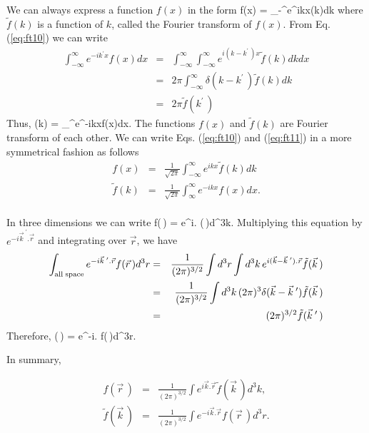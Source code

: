 We can always express a function $f(x)$ in the form
\be
f(x) = \int_{-\infty}^{\infty}e^{ikx}(k)dk
\label{eq:ft10}
\ee
where $\tilde{f}(k)$ is a function of $k$, called the Fourier transform of $f(x)$. From Eq. (\ref{eq:ft10}) we can write
\begin{eqnarray*}
\int_{-\infty}^{\infty}e^{-ik^{\prime}x}f(x)dx &=& \int_{-\infty}^{\infty}\int_{-\infty}^{\infty}e^{i(k-k^{\prime}\,)x}
\tilde{f}(k)dkdx \\
&=& 2\pi \int_{-\infty}^{\infty}\delta(k-k^{\prime}\,)\tilde{f}(k)dk \\
&=& 2\pi \tilde{f}(k^{\prime}\,)
\end{eqnarray*}
Thus, 
\be
{}(k) = \int_{\infty}^{\infty}e^{-ikx}f(x)dx.
\label{eq:ft11}
\ee
The functions $f(x)$ and $\tilde{f}(k)$ are Fourier transform of each other. We can write Eqs. (\ref{eq:ft10}) 
and (\ref{eq:ft11}) in a more symmetrical fashion as follows
\begin{eqnarray}
f(x)& = &\frac{1}{\sqrt{2\pi}} \int_{-\infty}^{\infty}e^{ikx}\tilde{f}(k)dk \\
\tilde{f}(k) &=& \frac{1}{\sqrt{2\pi}}\int_{\infty}^{\infty}e^{-ikx}f(x)dx.
\end{eqnarray}

\paragraph{}
In three dimensions we can write
\be
f(\,) =  \int e^{i.} (\,)d^3k.
\ee
Multiplying this equation by $e^{-i\vec{k}^{\; \prime}.\vec{r}}$ and integrating over $\vec{r}$, we have
\begin{eqnarray*}
\int_{{\rm all\; space}} e^{-i\vec{k}^{\; \prime}.\vec{r}} f(\vec{r}\,)d^3r
&=& \frac{1}{(2\pi)^{3/2}} \int d^3r\int d^3k\, e^{i(\vec{k}-\vec{k}^{\; \prime}).\vec{r}}\tilde{f}(\vec{k}\,) \\
&=& \frac{1}{(2\pi)^{3/2}} \int d^3k\, (2\pi)^{3} \delta(\vec{k}-\vec{k}^{\; \prime})\tilde{f}(\vec{k}\,) \\
&=& (2\pi)^{3/2} \tilde{f}(\vec{k}^{\; \prime}\,)
\end{eqnarray*}
Therefore,
\be
{}(\,) = \int e^{-i.} f(\,)d^3r.
\ee


\noindent
In summary, 

\begin{eqnarray}
f(\vec{r}\,)& =& \frac{1}{(2\pi)^{3/2}} \int e^{i\vec{k}.\vec{r}} \tilde{f}(\vec{k}\,)d^3k, \\
\tilde{f}(\vec{k}\,)& =& \frac{1}{(2\pi)^{3/2}}\int e^{-i\vec{k}.\vec{r}} f(\vec{r}\,)d^3r.
\end{eqnarray}


